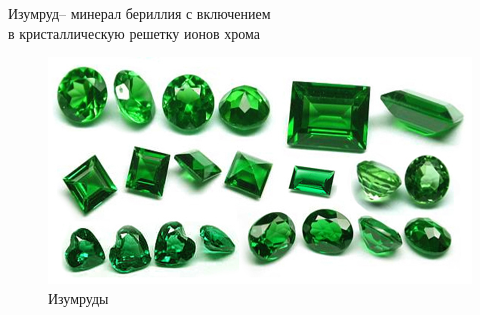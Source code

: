 \documentclass[_Banking_p3.tex]{subfiles}
\begin{document}
\begin{frame}{Изумруд}{– минерал бериллия с включением\\ в кристаллическую решетку ионов хрома}
\begin{figure}	
	\centering
	\includegraphics[scale=0.55]{img/emeralds.png}
	\caption{Изумруды}\label{fig:emeralds}
\end{figure}
\end{frame}
\end{document}
